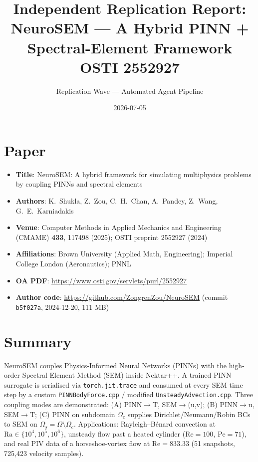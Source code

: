 \documentclass[11pt]{article}
\title{Independent Replication Report:\\
NeuroSEM --- A Hybrid PINN + Spectral-Element Framework\\
\large OSTI 2552927}
\author{Replication Wave --- Automated Agent Pipeline}
\date{2026-07-05}
\begin{document}
\maketitle

\section{Paper}
\begin{itemize}
  \item \textbf{Title}: NeuroSEM: A hybrid framework for simulating multiphysics problems by coupling PINNs and spectral elements
  \item \textbf{Authors}: K.\ Shukla, Z.\ Zou, C.\ H.\ Chan, A.\ Pandey, Z.\ Wang, G.\ E.\ Karniadakis
  \item \textbf{Venue}: Computer Methods in Applied Mechanics and Engineering (CMAME) \textbf{433}, 117498 (2025); OSTI preprint 2552927 (2024)
  \item \textbf{Affiliations}: Brown University (Applied Math, Engineering); Imperial College London (Aeronautics); PNNL
  \item \textbf{OA PDF}: \url{https://www.osti.gov/servlets/purl/2552927}
  \item \textbf{Author code}: \url{https://github.com/ZongrenZou/NeuroSEM} (commit \texttt{b5f027a}, 2024-12-20, 111 MB)
\end{itemize}

\section{Summary}
NeuroSEM couples Physics-Informed Neural Networks (PINNs) with the high-order
Spectral Element Method (SEM) inside Nektar++. A trained PINN surrogate is
serialised via \texttt{torch.jit.trace} and consumed at every SEM time step by a
custom \texttt{PINNBodyForce.cpp} / modified \texttt{UnsteadyAdvection.cpp}.
Three coupling modes are demonstrated: (A) PINN$\to$T, SEM$\to$(u,v);
(B) PINN$\to$u, SEM$\to$T; (C) PINN on subdomain $\Omega_c$ supplies
Dirichlet/Neumann/Robin BCs to SEM on $\Omega_s = \Omega \setminus \Omega_c$.
Applications: Rayleigh--B\'enard convection at
$\text{Ra}\in\{10^4,10^5,10^6\}$, unsteady flow past a heated cylinder
($\text{Re}=100$, $\text{Pe}=71$), and real PIV data of a horseshoe-vortex
flow at $\text{Re}=833.33$ (51 snapshots, 725{,}423 velocity samples).
\end{document}
